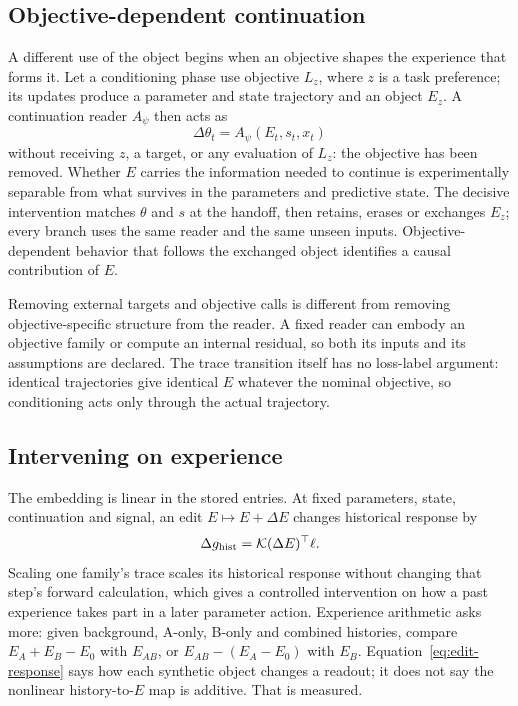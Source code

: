 \documentclass[11pt]{article}
\theoremstyle{definition}
\begin{document}
\subsection{Objective-dependent continuation}
\label{sec:objective-continuation}

A different use of the object begins when an objective shapes the experience that
forms it. Let a conditioning phase use objective $L_z$, where $z$ is a task
preference; its updates produce a parameter and state trajectory and an object
$E_z$. A continuation reader $A_\psi$ then acts as
\begin{equation}
 \Delta\theta_t=A_\psi(E_t,s_t,x_t)
 \label{eq:conditioned-action}
\end{equation}
without receiving $z$, a target, or any evaluation of $L_z$: the objective has been
removed. Whether $E$ carries the information needed to continue is experimentally
separable from what survives in the parameters and predictive state. The decisive
intervention matches $\theta$ and $s$ at the handoff, then retains, erases or
exchanges $E_z$; every branch uses the same reader and the same unseen inputs.
Objective-dependent behavior that follows the exchanged object identifies a causal
contribution of $E$.

Removing external targets and objective calls is different from removing
objective-specific structure from the reader. A fixed reader can embody an
objective family or compute an internal residual, so both its inputs and its
assumptions are declared. The trace transition itself has no loss-label argument:
identical trajectories give identical $E$ whatever the nominal objective, so
conditioning acts only through the actual trajectory.

\subsection{Intervening on experience}

The embedding is linear in the stored entries. At fixed parameters, state,
continuation and signal, an edit $E\mapsto E+\Delta E$ changes historical
response by
\begin{equation}
 \Delta g_{\rm hist}=\mathcal K(\Delta E)^\top\ell.
 \label{eq:edit-response}
\end{equation}
Scaling one family's trace scales its historical response without changing that
step's forward calculation, which gives a controlled intervention on how a past
experience takes part in a later parameter action. Experience arithmetic asks
more: given background, A-only, B-only and combined histories, compare
$E_A+E_B-E_0$ with $E_{AB}$, or $E_{AB}-(E_A-E_0)$ with $E_B$.
Equation~\eqref{eq:edit-response} says how each synthetic object changes a readout;
it does not say the nonlinear history-to-$E$ map is additive. That is measured.
\end{document}
